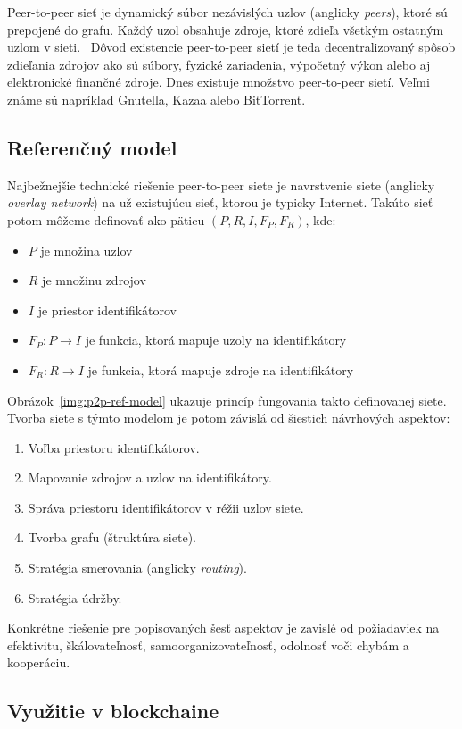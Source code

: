 Peer-to-peer sieť je dynamický súbor nezávislých uzlov (anglicky \textit{peers}), ktoré sú prepojené do grafu. Každý uzol obsahuje zdroje, ktoré zdieľa všetkým ostatným uzlom v sieti.~\cite{p2pBuford, p2pSchollmeier} Dôvod existencie peer-to-peer sietí je teda decentralizovaný spôsob zdieľania zdrojov ako sú súbory, fyzické zariadenia, výpočetný výkon alebo aj elektronické finančné zdroje. Dnes existuje množstvo peer-to-peer sietí. Veľmi známe sú napríklad Gnutella, Kazaa alebo BitTorrent.~\cite{p2pEssence}

\subsection{Referenčný model}
Najbežnejšie technické riešenie peer-to-peer siete je navrstvenie siete (anglicky \textit{overlay network}) na už existujúcu sieť, ktorou je typicky Internet. Takúto sieť potom môžeme definovať ako päticu $(P,R,I,F_P,F_R)$, kde:
\begin{itemize}
	\item $P$ je množina uzlov
	\item $R$ je množinu zdrojov
	\item $I$ je priestor identifikátorov
	\item $F_P: P \rightarrow I$ je funkcia, ktorá mapuje uzoly na identifikátory
	\item $F_R: R \rightarrow I$ je funkcia, ktorá mapuje zdroje na identifikátory
\end{itemize}

Obrázok~\ref{img:p2p-ref-model} ukazuje princíp fungovania takto definovanej siete. Tvorba siete s týmto modelom je potom závislá od šiestich návrhových aspektov:
\begin{enumerate}
	\item Voľba priestoru identifikátorov.
	\item Mapovanie zdrojov a uzlov na identifikátory.
	\item Správa priestoru identifikátorov v réžii uzlov siete.
	\item Tvorba grafu (štruktúra siete).
	\item Stratégia smerovania (anglicky \textit{routing}).
	\item Stratégia údržby.
\end{enumerate}
Konkrétne riešenie pre popisovaných šesť aspektov je zavislé od požiadaviek na efektivitu, škálovateľnosť, samoorganizovateľnosť, odolnosť voči chybám a kooperáciu.~\cite{p2pEssence}

\subsection{Využitie v blockchaine}

